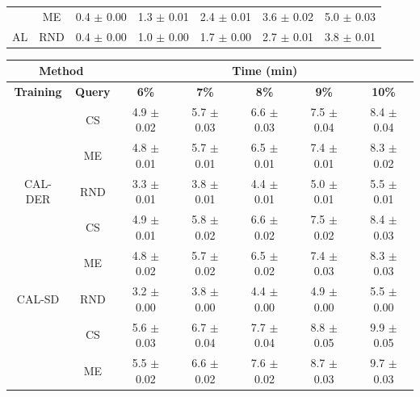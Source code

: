 \begin{table}[htbp]
\begin{tabular*}{\linewidth}{c|c|@{\extracolsep{\fill}}ccccc}
 & ME & 0.4 $\pm$ {\small 0.00} & 1.3 $\pm$ {\small 0.01} & 2.4 $\pm$ {\small 0.01} & 3.6 $\pm$ {\small 0.02} & 5.0 $\pm$ {\small 0.03}\\

\multirow{-3}{*}{\raggedright\arraybackslash AL} & RND & 0.4 $\pm$ {\small 0.00} & 1.0 $\pm$ {\small 0.00} & 1.7 $\pm$ {\small 0.00} & 2.7 $\pm$ {\small 0.01} & 3.8 $\pm$ {\small 0.01}\\
\bottomrule
\end{tabular*}
\vspace{0.5em}

\begin{tabular*}{\linewidth}{c|c|@{\extracolsep{\fill}}ccccc}
\toprule
\multicolumn{2}{c|}{\textbf{Method}} & \multicolumn{5}{c}{\textbf{Time (min)}} \\
\midrule
\textbf{Training} & \textbf{Query} & \textbf{6\%} & \textbf{7\%} & \textbf{8\%} & \textbf{9\%} & \textbf{10\%}\\
\midrule
 & CS & 4.9 $\pm$ {\small 0.02} & 5.7 $\pm$ {\small 0.03} & 6.6 $\pm$ {\small 0.03} & 7.5 $\pm$ {\small 0.04} & 8.4 $\pm$ {\small 0.04}\\

 & ME & 4.8 $\pm$ {\small 0.01} & 5.7 $\pm$ {\small 0.01} & 6.5 $\pm$ {\small 0.01} & 7.4 $\pm$ {\small 0.01} & 8.3 $\pm$ {\small 0.02}\\

\multirow{-3}{*}{\raggedright\arraybackslash CAL-DER} & RND & 3.3 $\pm$ {\small 0.01} & 3.8 $\pm$ {\small 0.01} & 4.4 $\pm$ {\small 0.01} & 5.0 $\pm$ {\small 0.01} & 5.5 $\pm$ {\small 0.01}\\
\midrule
 & CS & 4.9 $\pm$ {\small 0.01} & 5.8 $\pm$ {\small 0.02} & 6.6 $\pm$ {\small 0.02} & 7.5 $\pm$ {\small 0.02} & 8.4 $\pm$ {\small 0.03}\\

 & ME & 4.8 $\pm$ {\small 0.02} & 5.7 $\pm$ {\small 0.02} & 6.5 $\pm$ {\small 0.02} & 7.4 $\pm$ {\small 0.03} & 8.3 $\pm$ {\small 0.03}\\

\multirow{-3}{*}{\raggedright\arraybackslash CAL-SD} & RND & 3.2 $\pm$ {\small 0.00} & 3.8 $\pm$ {\small 0.00} & 4.4 $\pm$ {\small 0.00} & 4.9 $\pm$ {\small 0.00} & 5.5 $\pm$ {\small 0.00}\\
\midrule
 & CS & 5.6 $\pm$ {\small 0.03} & 6.7 $\pm$ {\small 0.04} & 7.7 $\pm$ {\small 0.04} & 8.8 $\pm$ {\small 0.05} & 9.9 $\pm$ {\small 0.05}\\

 & ME & 5.5 $\pm$ {\small 0.02} & 6.6 $\pm$ {\small 0.02} & 7.6 $\pm$ {\small 0.02} & 8.7 $\pm$ {\small 0.03} & 9.7 $\pm$ {\small 0.03}\\


\end{tabular*}
\end{table}
